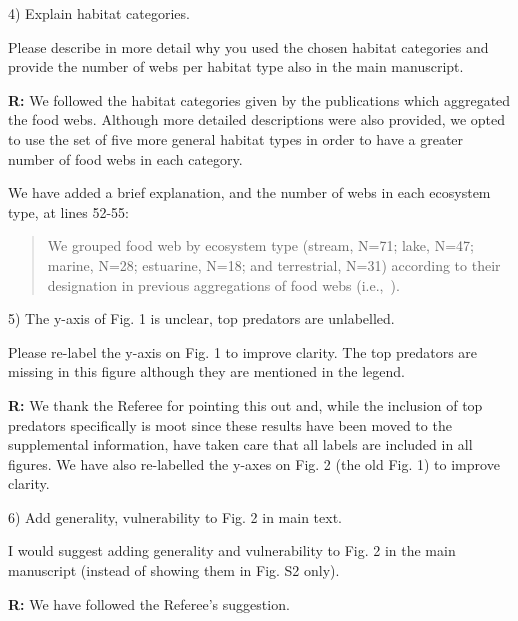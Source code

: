 \documentclass[12pt]{letter}
\newenvironment{refquote}{\bigskip \begin{it}}{\end{it}\smallskip}
\begin{document}
  4) Explain habitat categories.

  \begin{refquote}

    Please describe in more detail why you used the chosen habitat categories
    and provide the number of webs per habitat type also in the main
    manuscript.

  \end{refquote}


  \textbf{R:} We followed the habitat categories given by the publications which
  aggregated the food webs. Although more detailed descriptions were also provided, 
  we opted to use the set of five more general habitat types in order to have a 
  greater number of food webs in each category.


  We have added a brief explanation, and the number of webs in each ecosystem type, at lines 52-55:

  \begin{quotation}
    We grouped food web by ecosystem type (stream, N=71; lake, N=47; marine, N=28; estuarine, N=18;
    and terrestrial, N=31) according to their designation in previous aggregations of food webs 
    (i.e.,~\citet{GlobalWeb,Riede2011,Dunne2013}).
    
  \end{quotation}


  5) The y-axis of Fig. 1 is unclear, top predators are unlabelled.


  \begin{refquote}

    Please re-label the y-axis on Fig. 1 to improve clarity. The top predators
    are missing in this figure although they are mentioned in the legend.

  \end{refquote}


  \textbf{R:} We thank the Referee for pointing this out 
  and, while the inclusion of top predators specifically
  is moot since these results have been moved to the 
  supplemental information, have taken care that all labels
  are included in all figures. We have also re-labelled the
  y-axes on Fig. 2 (the old Fig. 1) to improve clarity.


  6) Add generality, vulnerability to Fig. 2 in main text.


  \begin{refquote}

    I would suggest adding generality and vulnerability to Fig. 2 in the main
    manuscript (instead of showing them in Fig. S2 only).

  \end{refquote}


  \textbf{R:} We have followed the Referee's suggestion.


  \newpage


 

\end{document}
